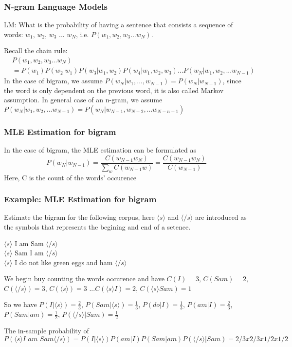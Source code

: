\documentclass[notheorems, aspectratio=54]{beamer}
\begin{document}
\begin{frame}
\frametitle{N-gram Language Models}
LM: What is the probability of having a sentence that consists a sequence of words: $w_1$, $w_2$, $w_3$ ... $w_N$, i.e. $P(w_1, w_2, w_3...w_N)$. 

Recall the chain rule:
\begin{align*}
&P(w_1, w_2, w_3...w_N)\\
&=P(w_1)P(w_2|w_1)P(w_3|w_1, w_2)P(w_4|w_1, w_2, w_3)...P(w_N|w_1, w_2, ...w_{N-1})
\end{align*}
In the case of bigram, we assume $P(w_N|w_1,...,w_{N-1})=P(w_N|w_{N-1})$, since the word is only dependent on the previous word, it is also called Markov assumption.
\vspace{0.2cm}
In general case of an n-gram, we assume $P(w_N|w_1, w_2, ...w_{N-1})=P(w_N|w_{N-1}, w_{N-2}, ...w_{N-n+1})$
\end{frame}

\begin{frame}
\frametitle{MLE Estimation for bigram }
In the case of bigram, the MLE estimation can be formulated as 
$$
P(w_N|w_{N-1})=\frac{C(w_{N-1}w_N)}{\sum_{w}C(w_{N-1}w)}=\frac{C(w_{N-1}w_N)}{C(w_{N-1})}
$$
Here, C is the count of the words' occurence
\end{frame}

\begin{frame}
\frametitle{Example: MLE Estimation for bigram }
Estimate the bigram for the following corpus, here $\langle s \rangle$ and $\langle /s\rangle$ are introduced as the symbols that represents the begining and  end of a setence.

$\langle s \rangle$ I am Sam $\langle /s\rangle$\\
$\langle s \rangle$ Sam I am $\langle /s\rangle$\\
$\langle s \rangle$ I do not like green eggs and ham $\langle /s \rangle$

We begin buy counting the words occurence and have $C(I)=3$, $C(Sam)=2$, $C(\langle /s\rangle)=3$, $C(\langle s\rangle)=3$ ...$C(\langle s \rangle I)=2$, $C(\langle s \rangle Sam)=1$

\vspace{0.2cm}

So we have $P(I|\langle s \rangle)=\frac{2}{3}$, $P(Sam|\langle s \rangle)=\frac{1}{3}$, $P(do|I)=\frac{1}{3}$, $P(am|I)=\frac{2}{3}$, $P(Sam|am)=\frac{1}{2}$, $P(\langle /s\rangle | Sam)=\frac{1}{2}$

\vspace{0.2cm}

The in-sample probability of $P(\langle s \rangle \textit{I am Sam}\langle /s\rangle)=P(I|\langle s \rangle)P(am|I)P(Sam|am)P(\langle /s\rangle | Sam)=2/3x2/3x1/2x1/2$

\end{frame}
\end{document}
